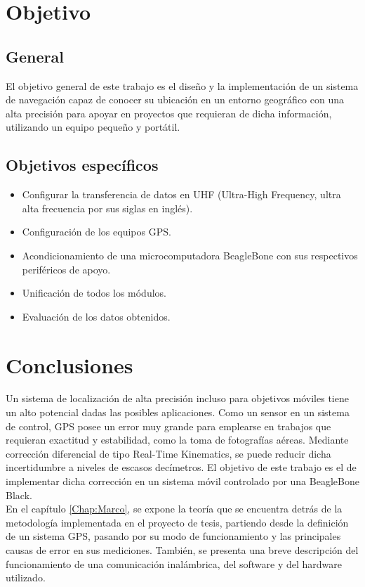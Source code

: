 \section{Objetivo}
\subsection{General}
El objetivo general de este trabajo es el diseño y la implementación de un sistema de navegación capaz de conocer su ubicación en un entorno geográfico con una alta precisión para apoyar en proyectos que requieran de dicha información, utilizando un equipo pequeño y portátil.

\subsection{Objetivos específicos}
\begin{itemize}
    \item Configurar la transferencia de datos en UHF (Ultra-High Frequency, ultra alta frecuencia por sus siglas en inglés).
    \item Configuración de los equipos GPS.
    \item Acondicionamiento de una microcomputadora BeagleBone con sus respectivos periféricos de apoyo.
    \item Unificación de todos los módulos.
	\item Evaluación de los datos obtenidos.    
\end{itemize}

\section{Conclusiones}

Un sistema de localización de alta precisión incluso para objetivos móviles tiene un alto potencial dadas las posibles aplicaciones. Como un sensor en un sistema de control, GPS posee un error muy grande para emplearse en trabajos que requieran exactitud y estabilidad, como la toma de fotografías aéreas. Mediante corrección diferencial de tipo Real-Time Kinematics, se puede reducir dicha incertidumbre a niveles de escasos decímetros. El objetivo de este trabajo es el de implementar dicha corrección en un sistema móvil controlado por una BeagleBone Black.\\

En el capítulo \ref{Chap:Marco}, se expone la teoría que se encuentra detrás de la metodología implementada en el proyecto de tesis, partiendo desde la definición de un sistema GPS, pasando por su modo de funcionamiento y las principales causas de error en sus mediciones. También, se presenta una breve descripción del funcionamiento de una comunicación inalámbrica, del software y del hardware utilizado.
